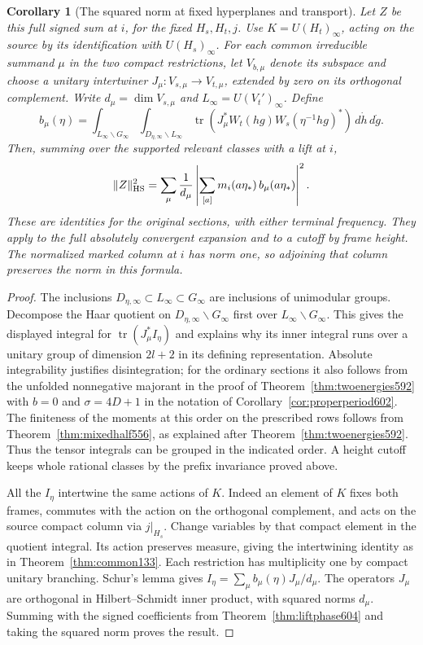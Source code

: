 \documentclass[a4paper,11pt]{article}
\newtheorem{corollary}[proposition]{Corollary}
\theoremstyle{definition}
\theoremstyle{remark}
\numberwithin{equation}{section}
\begin{document}
\begin{corollary}[The squared norm at fixed hyperplanes and transport]
\leavevmode\label{cor:signedslice604}
Let \(Z\) be this full signed sum at \(i\), for the fixed
\(H_s,H_t,j\). Use \(K=U(H_t)_\infty\), acting on the source
by its identification with \(U(H_s)_\infty\). For each common
irreducible summand \(\mu\) in the two compact restrictions,
let \(V_{b,\mu}\) denote its subspace and choose a unitary
intertwiner \(J_\mu:V_{s,\mu}\to V_{t,\mu}\), extended by
zero on its orthogonal complement. Write \(d_\mu=\dim V_{s,\mu}\)
and \(L_\infty=U(V_t')_\infty\). Define
\[
 b_\mu(\eta)=
 \int_{L_\infty\backslash G_\infty}
 \int_{D_{\eta,\infty}\backslash L_\infty}
 \operatorname{tr}\!\left(J_\mu^* W_t(hg)
                              W_s(\eta^{-1}hg)^*\right)
                                  \,d\dot h\,d\dot g .
\]
Then, summing over the supported relevant classes with a lift at \(i\),
\[
                \|Z\|_{\rm HS}^2=
           \sum_\mu \frac1{d_\mu}
            \left|\sum_{[a]} m_i(a\eta_*)\,b_\mu(a\eta_*)\right|^2 .
\]
These are identities for the original sections, with either
terminal frequency. They apply to the full absolutely
convergent expansion and to a cutoff by frame height. The
normalized marked column at \(i\) has norm one, so adjoining
that column preserves the norm in this formula.
\end{corollary}
\begin{proof}
The inclusions \(D_{\eta,\infty}\subset L_\infty\subset G_\infty\)
are inclusions of unimodular groups. Decompose the Haar
quotient on \(D_{\eta,\infty}\backslash G_\infty\) first over
\(L_\infty\backslash G_\infty\). This gives the displayed
integral for \(\operatorname{tr}(J_\mu^* I_\eta)\) and explains
why its inner integral runs over a unitary group of dimension
\(2l+2\) in its defining representation. Absolute integrability
justifies disintegration; for the ordinary sections it also
follows from the unfolded nonnegative majorant in the proof of
Theorem~\ref{thm:twoenergies592} with \(b=0\) and
\(\sigma=4D+1\) in the notation of Corollary~\ref{cor:properperiod602}.
The finiteness of the moments at this order on the prescribed
rows follows from Theorem~\ref{thm:mixedhalf556}, as explained
after Theorem~\ref{thm:twoenergies592}. Thus the tensor integrals
can be grouped in the indicated order. A height cutoff keeps
whole rational classes by the prefix invariance proved above.

All the \(I_\eta\) intertwine the same actions of \(K\).
Indeed an element of \(K\) fixes both frames, commutes with
the action on the orthogonal complement, and acts on the
source compact column via \(j|_{H_s}\). Change variables by
that compact element in the quotient integral. Its action
preserves measure, giving the intertwining identity as in
Theorem~\ref{thm:common133}. Each restriction has multiplicity
one by compact unitary branching. Schur's lemma gives
\(I_\eta=\sum_\mu b_\mu(\eta)J_\mu/d_\mu\).
The operators \(J_\mu\) are orthogonal in Hilbert--Schmidt
inner product, with squared norms \(d_\mu\). Summing with
the signed coefficients from Theorem~\ref{thm:liftphase604}
and taking the squared norm proves the result.
\end{proof}
\end{document}
